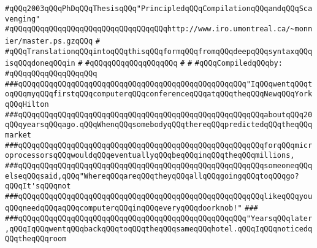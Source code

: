 \verb|#qQQq2003qQQqPhDqQQqThesisqQQq"PrincipledqQQqCompilationqQQqandqQQqScavenging"|\newline
\verb|#qQQqqQQqqQQqqQQqqQQqqQQqqQQqqQQqqQQqhttp://www.iro.umontreal.ca/~monnier/master.ps.gzqQQq|\newline
\verb|#|\newline
\verb|#qQQqTranslationqQQqintoqQQqthisqQQqformqQQqfromqQQqdeepqQQqsyntaxqQQqisqQQqdoneqQQqin|\newline
\verb|#|\newline
\verb|#qQQqqQQqqQQqqQQqqQQq|\newline
\verb|#|\newline
\verb|#|\newline
\newline
\verb|#qQQqCompiledqQQqby:|\newline
\verb|#qQQqqQQqqQQqqQQqqQQq|\newline
\newline
\newline
\newline
\newline
\verb|###qQQqqQQqqQQqqQQqqQQqqQQqqQQqqQQqqQQqqQQqqQQqqQQqqQQq"IqQQqwentqQQqtoqQQqmyqQQqfirstqQQqcomputerqQQqconferenceqQQqatqQQqtheqQQqNewqQQqYorkqQQqHilton|\newline
\verb|###qQQqqQQqqQQqqQQqqQQqqQQqqQQqqQQqqQQqqQQqqQQqqQQqqQQqqQQqaboutqQQq20qQQqyearsqQQqago.qQQqWhenqQQqsomebodyqQQqthereqQQqpredictedqQQqtheqQQqmarket|\newline
\verb|###qQQqqQQqqQQqqQQqqQQqqQQqqQQqqQQqqQQqqQQqqQQqqQQqqQQqqQQqforqQQqmicroprocessorsqQQqwouldqQQqeventuallyqQQqbeqQQqinqQQqtheqQQqmillions,|\newline
\verb|###qQQqqQQqqQQqqQQqqQQqqQQqqQQqqQQqqQQqqQQqqQQqqQQqqQQqqQQqsomeoneqQQqelseqQQqsaid,qQQq"WhereqQQqareqQQqtheyqQQqallqQQqgoingqQQqtoqQQqgo?qQQqIt'sqQQqnot|\newline
\verb|###qQQqqQQqqQQqqQQqqQQqqQQqqQQqqQQqqQQqqQQqqQQqqQQqqQQqqQQqlikeqQQqyouqQQqneedqQQqaqQQqcomputerqQQqinqQQqeveryqQQqdoorknob!"|\newline
\verb|###|\newline
\verb|###qQQqqQQqqQQqqQQqqQQqqQQqqQQqqQQqqQQqqQQqqQQqqQQqqQQq"YearsqQQqlater,qQQqIqQQqwentqQQqbackqQQqtoqQQqtheqQQqsameqQQqhotel.qQQqIqQQqnoticedqQQqtheqQQqroom|\newline
